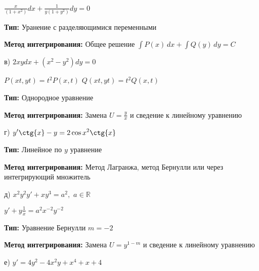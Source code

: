 \documentclass[a4paper]{article}
\begin{document}
\vspace{0.3cm}

$\displaystyle \frac{x}{(1+x^2)}dx +\frac{1}{y(1+y^2)}dy = 0$

\vspace{0.4cm}

\textbf{Тип: } Уранение с разделяющимися переменными

\textbf{Метод интегрирования: } Общее решение $\displaystyle \int\limits P(x)\,dx + \int\limits Q(y)\,dy = C$

\vspace{1cm}

в) $\displaystyle 2xydx + (x^2-y^2)dy = 0$

\vspace{0.3cm}

$\displaystyle P(xt, yt)=t^2P(x, t)$ \hspace{0.7cm} $\displaystyle Q(xt, yt)=t^2Q(x, t)$

\vspace{0.3cm}

\textbf{Тип: } Однородное уравнение

\textbf{Метод интегрирования: } Замена $\displaystyle U=\frac{y}{x}$ и сведение к линейному уравнению

\vspace{1cm}

г) $\displaystyle y'\ctg{x} -y=2\cos{x}^2\ctg{x}$

\vspace{0.3cm}

\textbf{Тип: } Линейное по $y$ уравнение

\textbf{Метод интегрирования: } Метод Лагранжа, метод Бернулли или через интегрирующий множитель

\vspace{1cm}

д) $\displaystyle x^2y^2y'+xy^3=a^2,$   $ a \in \mathbb{R}$

\vspace{0.3cm}

$\displaystyle y'+y\frac{1}{x}=a^2x^{-2}y^{-2}$

\vspace{0.3cm}

\textbf{Тип: } Уравнение Бернулли $m=-2$

\textbf{Метод интегрирования: } Замена $U=y^{1-m}$ и сведение к линейному уравнению

\vspace{1cm}

е) $\displaystyle y'=4y^2-4x^2y+x^4+x+4$
\end{document}
